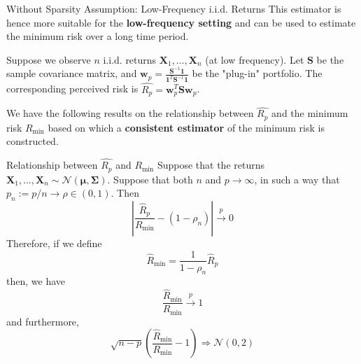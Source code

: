 \documentclass{beamer}
\begin{document}
\begin{frame}{Without Sparsity Assumption: Low-Frequency i.i.d. Returns}
This estimator is hence more suitable for the \textbf{low-frequency setting} and can be used to estimate the minimum risk over a long time period.\newline

Suppose we observe $n$ i.i.d. returns $\bm{X}_1, \dots, \bm{X}_n$ (at low frequency). Let $\bm{S}$ be the sample covariance matrix, and $\bm{w}_p = \frac{\bm{S}^{-1}\bm{1}}{\bm{1}^T\bm{S}^{-1}\bm{1}}$ be the "plug-in" portfolio. The corresponding perceived risk is $\hat{R_p} = \bm{w}_p^T\bm{S}\bm{w}_p$.\newline

We have the following results on the relationship between $\hat{R_p}$ and the minimum risk $R_{\min}$ based on which a \textbf{consistent estimator} of the minimum risk is constructed.
\end{frame}

\begin{frame}{Relationship between $\hat{R_p}$ and $R_{\min}$}
Suppose that the returns $\bm{X}_1, \dots, \bm{X}_n\sim \mathcal{N}(\bm{\mu, \Sigma})$. Suppose that both $n$ and $p \to \infty$, in such a way that $p_n := p/n\to \rho \in (0,1) $. Then
\begin{equation}
\label{eqt:2-14}
\left|\frac{\widehat{R}_p}{R_{\min }}-\left(1-\rho_n\right)\right| \stackrel{p}{\longrightarrow} 0
\end{equation}
Therefore, if we define
\begin{equation}
\label{eqt:2-15}
\widehat{R}_{\min }=\frac{1}{1-\rho_n} \widehat{R}_p
\end{equation}
then, we have
\begin{equation}
\label{eqt:2-16}
\frac{\widehat{R}_{\min }}{R_{\min }} \stackrel{p}{\longrightarrow} 1
\end{equation}
and furthermore,
\begin{equation}
\label{eqt:2-17}
\sqrt{n-p}\left(\frac{\widehat{R}_{\min }}{R_{\min }}-1\right) \Rightarrow \mathcal{N}(0,2)
\end{equation}

\end{frame}
\end{document}
